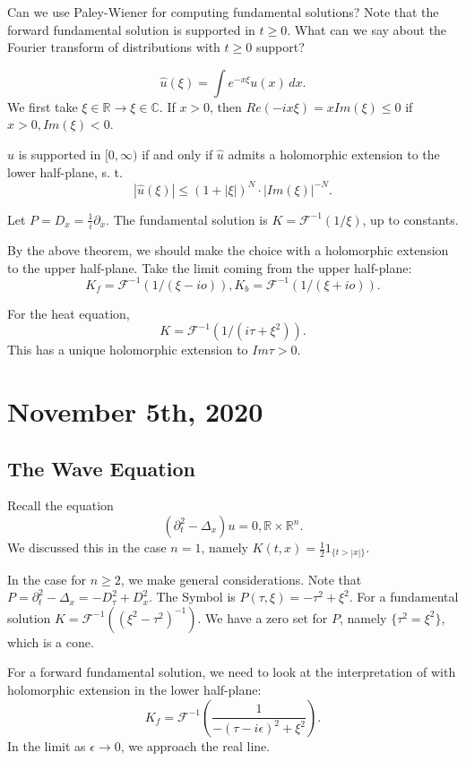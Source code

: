 \documentclass[12pt]{scrartcl}
\newcommand{\R}{\mathbb{R}}
\newcommand{\C}{\mathbb C}
\renewcommand{\hat}{\widehat}
\begin{document}
Can we use Paley-Wiener for computing fundamental solutions?  Note that the forward fundamental solution is supported in $t \ge 0$.  What can we say about the Fourier transform of distributions with $t\ge 0$ support?  

$$\hat{u}(\xi) = \int e^{-x\xi}u(x)\, dx.$$
We first take $\xi \in \R \to \xi \in \C$.  If $x > 0$, then $Re(-ix\xi) = x Im(\xi) \le 0$ if $x >0, Im(\xi) < 0$.

\begin{thm} $u$ is supported in $[0, \infty)$ if and only if $\hat{u}$ admits a holomorphic extension to the lower half-plane, s. t. 
$$|\hat{u}(\xi)| \le (1 + |\xi|)^N \cdot |Im(\xi)|^{-N}.$$
\end{thm}
\begin{example} Let $P = D_x = \frac{1}{i}\partial_x$.  The fundamental solution is $K = \mathcal F^{-1}(1/\xi)$, up to constants.  

By the above theorem, we should make the choice with a holomorphic extension to the upper half-plane.  Take the limit coming from the upper half-plane:
$$K_f = \mathcal{F}^{-1} (1/(\xi - io)), K_b = \mathcal{F}^{-1}(1/(\xi + io)).$$
\end{example}
\begin{example}
For the heat equation,
$$K = \mathcal{F}^{-1} (1/(i\tau + \xi^2)). $$
This has a unique holomorphic extension to $Im \tau > 0$.
\end{example}
\pagebreak
\section{November 5th, 2020}
\subsection{The Wave Equation}
Recall the equation
$$(\partial_t^2 - \Delta_x) u = 0, \R \times \R^n.$$
We discussed this in the case $n=1$, namely $K(t, x) = \frac{1}{2}1_{\{t > |x|\}}.$

In the case for $n \ge 2$, we make general considerations.  Note that $P = \partial_t^2 - \Delta_x = -D_\tau^2 + D_x^2$.  The Symbol is $P(\tau, \xi) = -\tau^2 + \xi^2$.  For a fundamental solution $K = \mathcal F^{-1}((\xi^2 - \tau^2)^{-1}).$  We have a zero set for $P$, namely $\{\tau^2 = \xi^2\}$, which is a cone.  

For a forward fundamental solution, we need to look at the interpretation of with holomorphic extension in the lower half-plane:
$$K_f = \mathcal F^{-1}\left (\frac{1}{-(\tau - i\epsilon)^2 + \xi^2}\right).$$
In the limit as $\epsilon \to 0$, we approach the real line.
\end{document}
